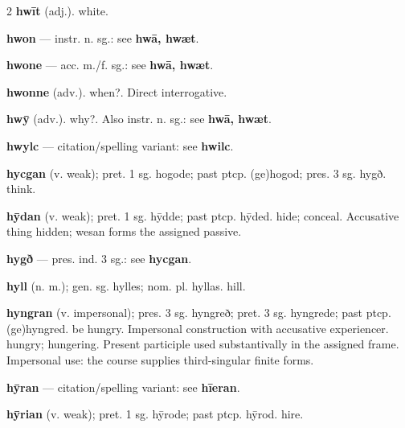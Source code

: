 \begin{multicols*}{2}
\textbf{hwīt} (adj.). white.\par
\textbf{hwon} — instr. n. sg.: see \textbf{hwā, hwæt}.\par
\textbf{hwone} — acc. m./f. sg.: see \textbf{hwā, hwæt}.\par
\textbf{hwonne} (adv.). when?. Direct interrogative.\par
\textbf{hwȳ} (adv.). why?. Also instr. n. sg.: see \textbf{hwā, hwæt}.\par
\textbf{hwylc} — citation/spelling variant: see \textbf{hwilc}.\par
\textbf{hycgan} (v. weak); pret. 1 sg. hogode; past ptcp. (ge)hogod; pres. 3 sg. hygð. think.\par
\textbf{hȳdan} (v. weak); pret. 1 sg. hȳdde; past ptcp. hȳded. hide; conceal. Accusative thing hidden; wesan forms the assigned passive.\par
\textbf{hygð} — pres. ind. 3 sg.: see \textbf{hycgan}.\par
\textbf{hyll} (n. m.); gen. sg. hylles; nom. pl. hyllas. hill.\par
\textbf{hyngran} (v. impersonal); pres. 3 sg. hyngreð; pret. 3 sg. hyngrede; past ptcp. (ge)hyngred. be hungry. Impersonal construction with accusative experiencer. hungry; hungering. Present participle used substantivally in the assigned frame. Impersonal use: the course supplies third-singular finite forms.\par
\textbf{hȳran} — citation/spelling variant: see \textbf{hīeran}.\par
\textbf{hȳrian} (v. weak); pret. 1 sg. hȳrode; past ptcp. hȳrod. hire.\par

\end{multicols*}
